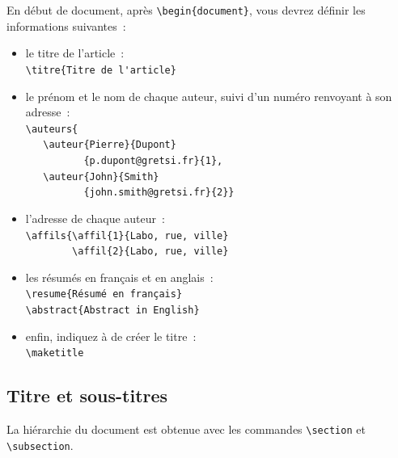 \documentclass[francais]{gretsi}
\begin{document}
En début de document, après \verb!\begin{document}!, vous devrez définir les informations suivantes~:
\begin{itemize}

  \item le titre de l'article~:\\
  \verb!\titre{Titre de l'article}!

  \item le prénom et le nom de chaque auteur, suivi d'un numéro renvoyant à son adresse~:\\
  \verb!\auteurs{!\\
  \verb!   \auteur{Pierre}{Dupont}!\\
  \verb!          {p.dupont@gretsi.fr}{1},!\\
  \verb!   \auteur{John}{Smith}!\\
  \verb!          {john.smith@gretsi.fr}{2}}!

  \item l'adresse de chaque auteur~:\\
  \verb!\affils{\affil{1}{Labo, rue, ville}! \\
  \verb!        \affil{2}{Labo, rue, ville}!

  \item les résumés en français et en anglais~:\\
  \verb!\resume{Résumé en français}! \\
  \verb!\abstract{Abstract in English}!

  \item enfin, indiquez à \LaTeXe de créer le titre~: \\
  \verb!\maketitle! \\

\end{itemize}

\subsection{Titre et sous-titres}

La hiérarchie du document est obtenue avec les commandes \verb!\section! et \verb!\subsection!.
\end{document}
